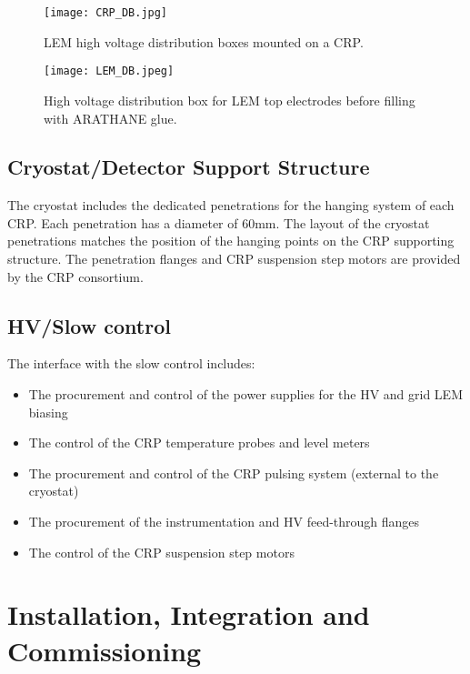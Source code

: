 \begin{figure}[h!]
  \centering
  \texttt{[image: CRP\_DB.jpg]}
  \caption{LEM high voltage distribution boxes mounted on a CRP.}
  \label{fig:CRP_DB} 
\end{figure}

\begin{figure}[h!]
  \centering
  \texttt{[image: LEM\_DB.jpeg]}
  \caption{High voltage distribution box for LEM top electrodes before filling with ARATHANE glue.}
  \label{fig:LEM_DB} 
\end{figure}

\subsection{Cryostat/Detector Support Structure}
\label{sec:fddp-crp-intfc-support}

The cryostat includes the dedicated penetrations for the hanging system of each CRP. Each penetration has a diameter of 60mm. The layout of the cryostat penetrations   matches the position of the hanging points on the CRP supporting structure. The penetration flanges and CRP suspension step motors are provided by the CRP consortium.

\subsection{HV/Slow control}
\label{sec:fddp-crp-intfc-HV-slowcontrol}

The interface with the slow control includes:

\begin{itemize}
\item The procurement and control of the power supplies for the HV and grid LEM biasing
\item The control of the CRP temperature probes and level meters
\item The procurement and control of the CRP pulsing system (external to the cryostat)
\item The procurement of the instrumentation and HV feed-through flanges
\item The control of the CRP suspension step motors
\end{itemize}

\section{Installation, Integration and Commissioning}
\label{sec:fddp-crp-install}


